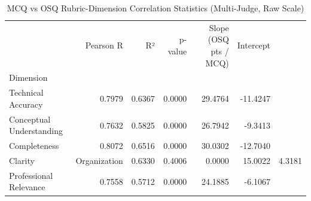 \begin{table}
\caption{MCQ vs OSQ Rubric-Dimension Correlation Statistics (Multi-Judge, Raw Scale)}
\label{tab:mcq_osq_rubric_corr_mj_raw}
\begin{tabular}{lrrrrr}
\toprule
 & Pearson R & R² & p-value & Slope (OSQ pts / MCQ) & Intercept \\
Dimension &  &  &  &  &  \\
\midrule
Technical Accuracy & 0.7979 & 0.6367 & 0.0000 & 29.4764 & -11.4247 \\
Conceptual Understanding & 0.7632 & 0.5825 & 0.0000 & 26.7942 & -9.3413 \\
Completeness & 0.8072 & 0.6516 & 0.0000 & 30.0302 & -12.7040 \\
Clarity & Organization & 0.6330 & 0.4006 & 0.0000 & 15.0022 & 4.3181 \\
Professional Relevance & 0.7558 & 0.5712 & 0.0000 & 24.1885 & -6.1067 \\
\bottomrule
\end{tabular}
\end{table}

